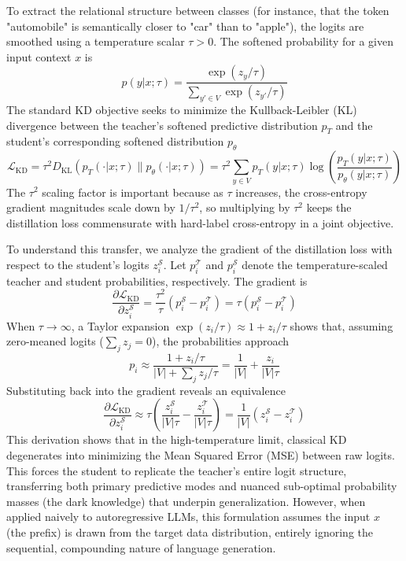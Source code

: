 \documentclass{article} %
\newcommand{\KL}{D_{\mathrm{KL}}}
\newcommand{\ptheta}{p_\theta}
\newcommand{\pteacher}{p_T}
\newcommand{\loss}{\mathcal{L}}
\begin{document}
To extract the relational structure between classes (for instance, that the token "automobile" is semantically closer to "car" than to "apple"), the logits are smoothed using a temperature scalar $\tau > 0$. The softened probability for a given input context $x$ is
\begin{equation}
    p(y|x; \tau) = \frac{\exp(z_y / \tau)}{\sum_{y' \in V} \exp(z_{y'} / \tau)}
\end{equation}
The standard KD objective seeks to minimize the Kullback-Leibler (KL) divergence between the teacher's softened predictive distribution $\pteacher$ and the student's corresponding softened distribution $\ptheta$
\begin{equation}
    \loss_{\mathrm{KD}} = \tau^2 \KL(\pteacher(\cdot|x; \tau) \parallel \ptheta(\cdot|x; \tau)) = \tau^2 \sum_{y \in V} \pteacher(y|x; \tau) \log \left( \frac{\pteacher(y|x; \tau)}{\ptheta(y|x; \tau)} \right)
\end{equation}
The $\tau^2$ scaling factor is important because as $\tau$ increases, the cross-entropy gradient magnitudes scale down by $1/\tau^2$, so multiplying by $\tau^2$ keeps the distillation loss commensurate with hard-label cross-entropy in a joint objective.

To understand this transfer, we analyze the gradient of the distillation loss with respect to the student's logits $z_i^{\mathcal{S}}$. Let $p_i^{\mathcal{T}}$ and $p_i^{\mathcal{S}}$ denote the temperature-scaled teacher and student probabilities, respectively. The gradient is
\begin{equation}
    \frac{\partial \loss_{\mathrm{KD}}}{\partial z_i^{\mathcal{S}}} = \frac{\tau^2}{\tau} (p_i^{\mathcal{S}} - p_i^{\mathcal{T}}) = \tau (p_i^{\mathcal{S}} - p_i^{\mathcal{T}})
\end{equation}
When $\tau \to \infty$, a Taylor expansion $\exp(z_i/\tau) \approx 1 + z_i/\tau$ shows that, assuming zero-meaned logits ($\sum_j z_j = 0$), the probabilities approach
\begin{equation}
    p_i \approx \frac{1 + z_i/\tau}{|V| + \sum_j z_j/\tau} = \frac{1}{|V|} + \frac{z_i}{|V|\tau}
\end{equation}
Substituting back into the gradient reveals an equivalence
\begin{equation}
    \frac{\partial \loss_{\mathrm{KD}}}{\partial z_i^{\mathcal{S}}} \approx \tau \left( \frac{z_i^{\mathcal{S}}}{|V|\tau} - \frac{z_i^{\mathcal{T}}}{|V|\tau} \right) = \frac{1}{|V|} (z_i^{\mathcal{S}} - z_i^{\mathcal{T}})
\end{equation}
This derivation shows that in the high-temperature limit, classical KD degenerates into minimizing the Mean Squared Error (MSE) between raw logits. This forces the student to replicate the teacher's entire logit structure, transferring both primary predictive modes and nuanced sub-optimal probability masses (the dark knowledge) that underpin generalization. However, when applied naively to autoregressive LLMs, this formulation assumes the input $x$ (the prefix) is drawn from the target data distribution, entirely ignoring the sequential, compounding nature of language generation.
\end{document}
